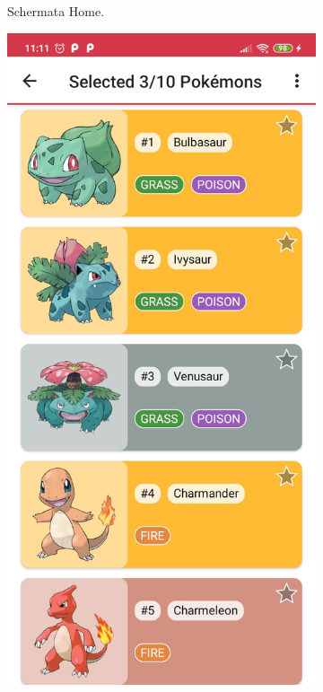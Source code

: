 \documentclass[a4paper,11pt]{article}
\begin{document}
\begin{figure}[h!]
{\begin{subfigure}[b]{0.3\linewidth}
    \caption{Schermata Home.}
  \end{subfigure}
  \begin{subfigure}[b]{0.3\linewidth}
    \includegraphics[width=\linewidth]{multiple_selection.jpg}

\end{subfigure}}
\end{figure}
\end{document}
